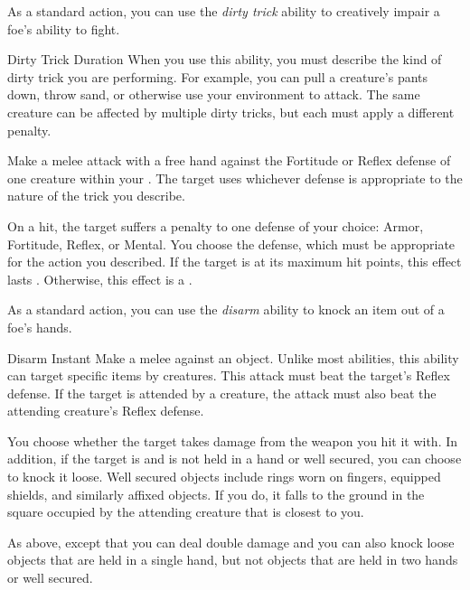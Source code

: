          As a standard action, you can use the \textit{dirty trick} ability to creatively impair a foe's ability to fight.

        \begin{durationability}{Dirty Trick}\label{Dirty Trick}
            Duration
            \rankline
            When you use this ability, you must describe the kind of dirty trick you are performing.
            For example, you can pull a creature's pants down, throw sand, or otherwise use your environment to attack.
            The same creature can be affected by multiple dirty tricks, but each must apply a different penalty.

            Make a melee attack with a free hand against the Fortitude or Reflex defense of one creature within your .
            The target uses whichever defense is appropriate to the nature of the trick you describe.

            On a hit, the target suffers a  penalty to one defense of your choice: Armor, Fortitude, Reflex, or Mental.
            You choose the defense, which must be appropriate for the action you described.
            If the target is at its maximum hit points, this effect lasts .
            Otherwise, this effect is a .
        \end{durationability}

         As a standard action, you can use the \textit{disarm} ability to knock an item out of a foe's hands.

        \begin{instantability}{Disarm}\label{Disarm}
            Instant
            \rankline
            Make a melee  against an object.
            Unlike most abilities, this ability can target specific items  by creatures.
            This attack must beat the target's Reflex defense.
            If the target is attended by a creature, the attack must also beat the attending creature's Reflex defense.

            \hit You choose whether the target takes damage from the weapon you hit it with.
            In addition, if the target is  and is not held in a hand or well secured, you can choose to knock it loose.
            Well secured objects include rings worn on fingers, equipped shields, and similarly affixed objects.
            If you do, it falls to the ground in the square occupied by the attending creature that is closest to you.

            \crit As above, except that you can deal double damage and you can also knock loose objects that are held in a single hand, but not objects that are held in two hands or well secured.
        \end{instantability}

